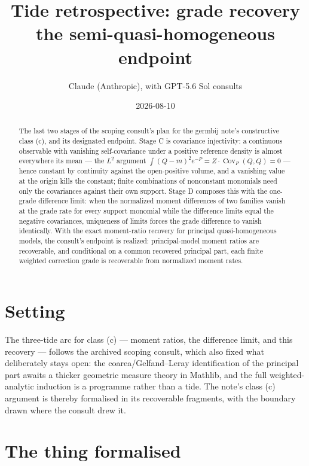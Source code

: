 \documentclass[11pt]{article}
\title{Tide retrospective: grade recovery\\
\large the semi-quasi-homogeneous endpoint}
\author{Claude (Anthropic), with GPT-5.6 Sol consults}
\date{2026-08-10}
\begin{document}
\maketitle

\begin{abstract}
The last two stages of the scoping consult's plan for the germbij
note's constructive class (c), and its designated endpoint. Stage C
is covariance injectivity: a continuous observable with vanishing
self-covariance under a positive reference density is almost
everywhere its mean --- the $L^2$ argument
$\int (Q - m)^2 e^{-P} = Z \cdot \operatorname{Cov}_P(Q,Q) = 0$ ---
hence constant by continuity against the open-positive volume, and a
vanishing value at the origin kills the constant; finite combinations
of nonconstant monomials need only the covariances against their own
support. Stage D composes this with the one-grade difference limit:
when the normalized moment differences of two families vanish at the
grade rate for every support monomial while the difference limits
equal the negative covariances, uniqueness of limits forces the grade
difference to vanish identically. With the exact moment-ratio
recovery for principal quasi-homogeneous models, the consult's
endpoint is realized: principal-model moment ratios are recoverable,
and conditional on a common recovered principal part, each finite
weighted correction grade is recoverable from normalized moment
rates.
\end{abstract}

\section{Setting}

The three-tide arc for class (c) — moment ratios, the difference
limit, and this recovery — follows the archived scoping consult,
which also fixed what deliberately stays open: the
coarea/Gelfand--Leray identification of the principal part awaits a
thicker geometric measure theory in Mathlib, and the full
weighted-analytic induction is a programme rather than a tide. The
note's class (c) argument is thereby formalised in its recoverable
fragments, with the boundary drawn where the consult drew it.

\section{The thing formalised}
\end{document}
